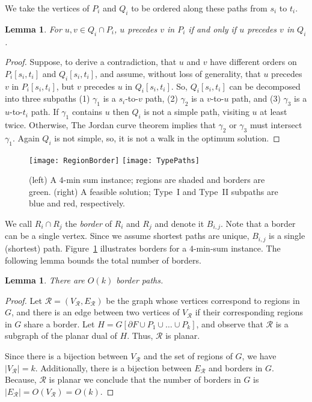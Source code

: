 \documentclass[11pt,twoside]{article}
\newtheorem{lemma}[theorem]{Lemma}
\newcommand{\spath}[1]{P_{#1}}
\newcommand{\opt}[1]{Q_{#1}}
\newcommand{\region}[1]{R_{#1}}
\newcommand{\border}[2]{B_{#1,#2}}
\begin{document}
\noindent We take the vertices of $\spath{i}$ and $\opt{i}$ to be ordered along these paths from $s_i$ to $t_i$.

\begin{lemma}
\label{lem:pqSameOrder}
For $u,v \in \opt{i} \cap \spath{i}$, $u$ precedes $v$ in $\spath{i}$ if and only if $u$ precedes $v$ in $\opt{i}$.
\end{lemma}
\begin{proof}
Suppose, to derive a contradiction, that $u$ and $v$ have different orders on $\spath{i}[s_i, t_i]$ and $\opt{i}[s_i, t_i]$, and assume, without loss of generality, that $u$ precedes $v$ in $\spath{i}[s_i, t_i]$, but $v$ precedes $u$ in $\opt{i}[s_i, t_i]$.  So, $\opt{i}[s_i, t_i]$ can be decomposed into three subpaths (1) $\gamma_1$ is a $s_i$-to-$v$ path, (2) $\gamma_2$ is a $v$-to-$u$ path, and (3) $\gamma_3$ is a $u$-to-$t_i$ path.  If $\gamma_1$ contains $u$ then $\opt{i}$ is not a simple path, visiting $u$ at least twice. Otherwise, The Jordan curve theorem implies that $\gamma_2$ or $\gamma_3$ must intersect $\gamma_1$.  Again $\opt{i}$ is not simple, so, it is not a walk in the optimum solution.
\end{proof}

\begin{figure}[tbh]
  \centering
    \texttt{[image: RegionBorder]}\qquad\qquad
    \texttt{[image: TypePaths]}
      \caption{(left) A $4$-min sum instance; regions are shaded and borders are green. (right) A feasible solution; Type~I and Type~II subpaths are blue and red, respectively.}
  \label{fig:4-Disj}
\end{figure}

We call $\region{i} \cap \region{j}$ the \emph{border} of $\region{i}$ and $\region{j}$ and denote it $\border{i}{j}$.   Note that a border can be a single vertex. Since we assume shortest paths are unique, $\border{i}{j}$ is a single (shortest) path.
Figure~\ref{fig:4-Disj} illustrates borders for a $4$-min-sum instance.  The following lemma bounds the total number of borders.

\begin{lemma}
\label{lem:bounded_number_borders}
There are $O(k)$ border paths. 
\end{lemma}
\begin{proof}
Let $\mathcal{R} = (V_{\mathcal{R}}, E_{\mathcal{R}})$ be the graph whose vertices correspond to regions in $G$, and there is an edge between two vertices of $V_{\mathcal{R}}$ if their corresponding regions in $G$ share a border.  Let $H = G[\partial F \cup \spath{1} \cup \ldots \cup \spath{k}]$, and observe that $\mathcal{R}$ is a subgraph of the planar dual of $H$.  Thus, $\mathcal{R}$ is planar.

Since there is a bijection between $V_{\mathcal{R}}$ and the set of regions of $G$, we have $|V_{\mathcal{R}}| = k$.
Additionally, there is a bijection between $E_{\mathcal{R}}$ and borders in $G$.  Because, $\mathcal{R}$ is planar we conclude that the number of borders in $G$ is $|E_{\mathcal{R}}| = O(V_{\mathcal{R}}) = O(k)$.
\end{proof}
\end{document}
